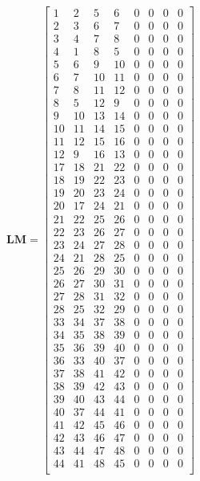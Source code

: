 \documentclass[10pt]{article}
\begin{document}
\begin{equation}
\textbf{LM}=
\begin{bmatrix}
1 & 2 & 5 & 6 & 0 & 0 & 0 & 0\\
2 & 3 & 6 & 7 & 0 & 0 & 0 & 0\\
3 & 4 & 7 & 8 & 0 & 0 & 0 & 0\\
4 & 1 & 8 & 5 & 0 & 0 & 0 & 0\\
5 & 6 & 9 & 10 & 0 & 0 & 0 & 0\\
6 & 7 & 10 & 11 & 0 & 0 & 0 & 0\\
7 & 8 & 11 & 12 & 0 & 0 & 0 & 0\\
8 & 5 & 12 & 9 & 0 & 0 & 0 & 0\\
9 & 10 & 13 & 14 & 0 & 0 & 0 & 0\\
10 & 11 & 14 & 15 & 0 & 0 & 0 & 0\\
11 & 12 & 15 & 16 & 0 & 0 & 0 & 0\\
12 & 9 & 16 & 13 & 0 & 0 & 0 & 0\\
17 & 18 & 21 & 22 & 0 & 0 & 0 & 0\\
18 & 19 & 22 & 23 & 0 & 0 & 0 & 0\\
19 & 20 & 23 & 24 & 0 & 0 & 0 & 0\\
20 & 17 & 24 & 21 & 0 & 0 & 0 & 0\\
21 & 22 & 25 & 26 & 0 & 0 & 0 & 0\\
22 & 23 & 26 & 27 & 0 & 0 & 0 & 0\\
23 & 24 & 27 & 28 & 0 & 0 & 0 & 0\\
24 & 21 & 28 & 25 & 0 & 0 & 0 & 0\\
25 & 26 & 29 & 30 & 0 & 0 & 0 & 0\\
26 & 27 & 30 & 31 & 0 & 0 & 0 & 0\\
27 & 28 & 31 & 32 & 0 & 0 & 0 & 0\\
28 & 25 & 32 & 29 & 0 & 0 & 0 & 0\\
33 & 34 & 37 & 38 & 0 & 0 & 0 & 0\\
34 & 35 & 38 & 39 & 0 & 0 & 0 & 0\\
35 & 36 & 39 & 40 & 0 & 0 & 0 & 0\\
36 & 33 & 40 & 37 & 0 & 0 & 0 & 0\\
37 & 38 & 41 & 42 & 0 & 0 & 0 & 0\\
38 & 39 & 42 & 43 & 0 & 0 & 0 & 0\\
39 & 40 & 43 & 44 & 0 & 0 & 0 & 0\\
40 & 37 & 44 & 41 & 0 & 0 & 0 & 0\\
41 & 42 & 45 & 46 & 0 & 0 & 0 & 0\\
42 & 43 & 46 & 47 & 0 & 0 & 0 & 0\\
43 & 44 & 47 & 48 & 0 & 0 & 0 & 0\\
44 & 41 & 48 & 45 & 0 & 0 & 0 & 0\\
\end{bmatrix}
\end{equation}
\end{document}
